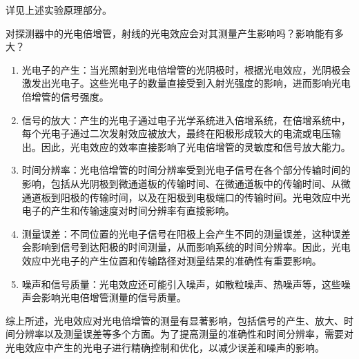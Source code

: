 \documentclass[dvipsnames, svgnames,a4paper,11pt]{article}
\begin{document}











	详见上述实验原理部分。
	





\begin{question}
	对探测器中的光电倍增管，射线的光电效应会对其测量产生影响吗？影响能有多大？
\end{question}

	

	\begin{enumerate}
		\item 光电子的产生：当光照射到光电倍增管的光阴极时，根据光电效应，光阴极会激发出光电子。这些光电子的数量直接受到入射光强度的影响，进而影响光电倍增管的信号强度。
		\item 信号的放大：产生的光电子通过电子光学系统进入倍增系统，在倍增系统中，每个光电子通过二次发射效应被放大，最终在阳极形成较大的电流或电压输出。因此，光电效应的效率直接影响了光电倍增管的灵敏度和信号放大能力。
		\item 时间分辨率：光电倍增管的时间分辨率受到光电子信号在各个部分传输时间的影响，包括从光阴极到微通道板的传输时间、在微通道板中的传输时间、从微通道板到阳极的传输时间，以及在阳极到电极端口的传输时间。光电效应中光电子的产生和传输速度对时间分辨率有直接影响。
		\item 测量误差：不同位置的光电子信号在阳极上会产生不同的测量误差，这种误差会影响到信号到达阳极的时间测量，从而影响系统的时间分辨率。因此，光电效应中光电子的产生位置和传输路径对测量结果的准确性有重要影响。
		\item 噪声和信号质量：光电效应还可能引入噪声，如散粒噪声、热噪声等，这些噪声会影响光电倍增管测量的信号质量。
	\end{enumerate}
	

	综上所述，光电效应对光电倍增管的测量有显著影响，包括信号的产生、放大、时间分辨率以及测量误差等多个方面。为了提高测量的准确性和时间分辨率，需要对光电效应中产生的光电子进行精确控制和优化，以减少误差和噪声的影响。
\end{document}
